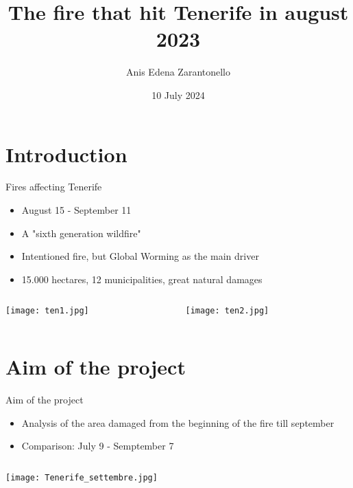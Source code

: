 \documentclass{beamer}
\title{The fire that hit Tenerife in august 2023}
\author{Anis Edena Zarantonello}
\date{10 July 2024}
\begin{document}
\maketitle %



\section{Introduction}
\begin{frame}{Fires affecting Tenerife}
\begin{itemize}
    \item August 15 - September 11
    \item A "sixth generation wildfire"
    \item Intentioned fire, but Global Worming as the main driver
    \item 15.000 hectares, 12 municipalities, great natural damages
\end{itemize}
\begin{columns}
\begin{column}{0.5\textwidth}
\begin{center}
    \texttt{[image: ten1.jpg]}
\end{center}
\end{column}
\begin{column}{0.5\textwidth}  
    \begin{center}
     \texttt{[image: ten2.jpg]}
     \end{center}
\end{column}
\end{columns}
\end{frame} 


\section{Aim of the project}

\begin{frame}{Aim of the project}
\begin{itemize}
    \item Analysis of the area damaged from the beginning of the fire till september
    \item Comparison: July 9 - Semptember 7
\end{itemize}
\begin{column}{1\textwidth}
    \begin{center}
        \texttt{[image: Tenerife\_settembre.jpg]}
    \end{center}
\end{column}
\end{frame}
\end{document}
